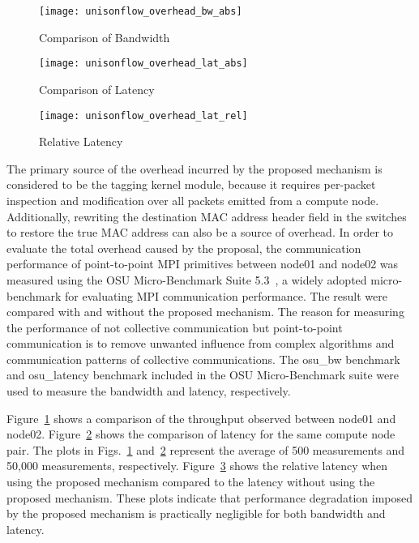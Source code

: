 \begin{figure}
    \centering
    \texttt{[image: unisonflow\_overhead\_bw\_abs]}
    \caption{Comparison of Bandwidth}%
    \label{fig:overhead-bandwidth}
\end{figure}

\begin{figure}
    \centering
    \texttt{[image: unisonflow\_overhead\_lat\_abs]}
    \caption{Comparison of Latency}%
    \label{fig:overhead-latency}
\end{figure}

\begin{figure}
    \centering
    \texttt{[image: unisonflow\_overhead\_lat\_rel]}
    \caption{Relative Latency}%
    \label{fig:overhead-latency-rel}
\end{figure}

The primary source of the overhead incurred by the proposed mechanism is
considered to be the tagging kernel module, because it requires
per-packet inspection and modification over all packets emitted from a
compute node. Additionally, rewriting the destination MAC address
header field in the switches to restore the true MAC address can also be
a source of overhead. In order to evaluate the total overhead caused by
the proposal, the communication performance of point-to-point MPI primitives
between node01 and node02 was measured using the OSU Micro-Benchmark Suite
5.3~\autocite{omb}, a widely adopted micro-benchmark for evaluating MPI
communication performance. The result were compared  with and without the
proposed mechanism. The reason for measuring the performance of not collective
communication but point-to-point communication is to remove unwanted influence
from complex algorithms and communication patterns of collective
communications. The osu\_bw benchmark and osu\_latency benchmark included in
the OSU Micro-Benchmark suite were used to measure the bandwidth and latency,
respectively.

Figure~\ref{fig:overhead-bandwidth} shows a comparison of the throughput
observed between node01 and node02. Figure~\ref{fig:overhead-latency} shows
the comparison of latency for the same compute node pair. The plots in
Figs.~\ref{fig:overhead-bandwidth} and~\ref{fig:overhead-latency} represent
the average of 500 measurements and 50,000 measurements, respectively.
Figure~\ref{fig:overhead-latency-rel} shows the relative latency when using
the proposed mechanism compared to the latency without using the proposed
mechanism. These plots indicate that performance degradation imposed by the
proposed mechanism is practically negligible for both bandwidth and latency.

